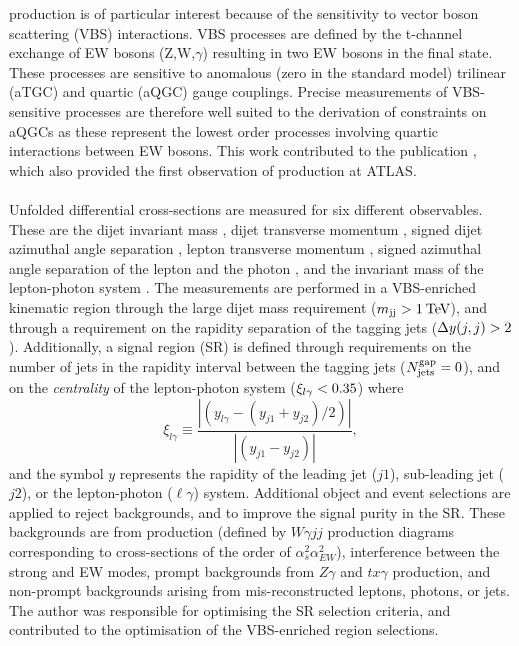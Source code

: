\documentclass{thesissummary}
\begin{document}
\Ewwy production is of particular interest because of the sensitivity to vector boson scattering (VBS) interactions. VBS processes are defined by the t-channel exchange of EW bosons (Z,W,$\gamma$) resulting in two EW bosons in the final state. These processes are sensitive to anomalous (zero in the standard model) trilinear (aTGC) and quartic (aQGC) gauge couplings. Precise measurements of VBS-sensitive processes are therefore well suited to the derivation of constraints on aQGCs as these represent the lowest order processes involving quartic interactions between EW bosons. This work contributed to the publication \cite{vbswy}, which also provided the first observation of \ewwy production at ATLAS. 
\\\\
%
Unfolded differential cross-sections are measured for six different observables. These are the dijet invariant mass \mjj, dijet transverse momentum \ptjj, signed dijet azimuthal angle separation \jjdphi, lepton transverse momentum \ptlep, signed azimuthal angle separation of the lepton and the photon \lepgamdphi, and the invariant mass of the lepton-photon system \mly. The measurements are performed in a VBS-enriched kinematic region through the large dijet mass requirement ($m_{\text{jj}}>1\hspace{2pt}\text{Te\kern -0.1em V}$), and through a requirement on the rapidity separation of the tagging jets ($\Delta y(j,j)>2$). 
Additionally, a signal region (SR) is defined through requirements on the number of jets in the rapidity interval between the tagging jets ($N^{\text{gap}}_{\text{jets}}=0$), and on the \textit{centrality} of the lepton-photon system ($\xi_{l\gamma}<0.35$)
where 
\begin{equation} 
    \xi_{l\gamma}\equiv\frac{|(y_{l\gamma}-(y_{j1}+y_{j2})/2)|}{|(y_{j1}-y_{j2})|},
\end{equation}
and the symbol $y$ represents the rapidity of the leading jet ($j1$), sub-leading jet ($j2$), or the lepton-photon ($\ell\gamma$) system.
Additional object and event selections are applied to reject backgrounds, and to improve the signal purity in the SR. These backgrounds are from \qcdwy production (defined by $W\gamma jj$ production diagrams corresponding to cross-sections of the order of $\alpha_s^2\alpha_{EW}^2$), interference between the strong and EW \wyjj modes, prompt backgrounds from $Z\gamma$ and $tx\gamma$ production, and non-prompt backgrounds arising from mis-reconstructed leptons, photons, or jets. The author was responsible for optimising the SR selection criteria, and contributed to the optimisation of the VBS-enriched region selections.
\end{document}
